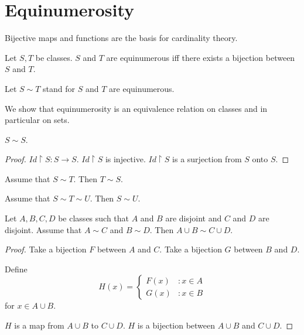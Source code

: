\documentclass{article}
\begin{document}
\section{Equinumerosity}
%
Bijective maps and functions are the basis for cardinality
theory.
%
\begin{forthel}
\begin{definition}
Let $S, T$ be classes.
$S$ and $T$ are equinumerous iff there exists a bijection between $S$ and
$T$.
\end{definition}

Let $S \sim T$ stand for $S$ and $T$ are equinumerous.
\end{forthel}
%
We show that equinumerosity is an equivalence relation on classes and
in particular on sets.
%
\begin{forthel}

\begin{lemma}
$S \sim S$.
\end{lemma}
\begin{proof}
$Id \upharpoonright S : S \rightarrow S$.
$Id \upharpoonright S$ is injective.
$Id \upharpoonright S$ is a surjection from $S$ onto $S$.
\end{proof}

\begin{lemma}
Assume that $S \sim T$. Then $T \sim S$.
\end{lemma}

\begin{lemma}
Assume that $S \sim T \sim U$. Then $S \sim U$.
\end{lemma}

\begin{lemma}
Let $A,B,C,D$ be classes such that $A$ and $B$ are disjoint and 
$C$ and $D$ are disjoint. Assume that $A \sim C$ and $B \sim D$.
Then $A \cup B \sim C \cup D$.
\end{lemma}
\begin{proof}
Take a bijection $F$ between $A$ and $C$.
Take a bijection $G$ between $B$ and $D$.

Define \[ H(x) =
          \begin{cases}
            F(x) & : x \in A \\
            G(x) & : x \in B
          \end{cases} \]
        for $x \in A \cup B$.

$H$ is a map from $A \cup B$ to $C \cup D$.
$H$ is a bijection between $A \cup B$ and $C \cup D$.
\end{proof}

\end{forthel}
\end{document}
